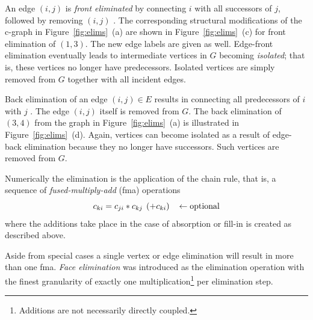 \documentclass[acmtocl,acmnow]{acmtrans2m}
\newcommand{\reffig}[1]{Figure~\ref{#1}}
\begin{document}
An edge $(i,j)$ is {\em front eliminated} by connecting $i$ with all successors
of $j$, followed by removing $(i,j)$ \cite{ElimTechAD2000}.
The corresponding structural modifications of the c-graph in
\reffig{fig:elims}~(a) are shown in
\reffig{fig:elims}~(c) for front elimination of $(1,3).$
The new edge labels are given as well.
Edge-front elimination eventually leads to intermediate vertices in $G$
becoming
{\em isolated}; that is, these vertices no longer have predecessors.
Isolated vertices are simply removed from $G$ together
with all incident edges.

Back elimination of an edge
$(i,j) \in E$ results in connecting all predecessors of $i$
with $j$ \cite{ElimTechAD2000}.
The edge $(i,j)$ itself is removed from $G.$
The back elimination of $(3,4)$ from the graph in \reffig{fig:elims}~(a) 
is illustrated in \reffig{fig:elims}~(d). 
Again, vertices can become isolated as a result of edge-back elimination
because they no longer have successors.
Such vertices are removed from $G.$

Numerically the elimination is the application of 
the chain rule, that is, a sequence of {\em fused-multiply-add} (fma) operations
\begin{equation}\label{eqn:fma}
c_{ki}=c_{ji}*c_{kj}\hspace*{1ex}(+c_{ki}) \hspace*{2ex}\gets \mbox{optional}
\end{equation}
where the additions take place in the case of absorption or fill-in is created 
as described above.

Aside from special cases a single vertex or edge elimination will result in more
than one fma. {\em Face elimination} was introduced 
as the elimination operation with the finest granularity of exactly 
one multiplication\footnote{Additions are not necessarily directly coupled.} 
per elimination step.
\end{document}
